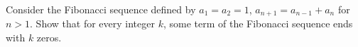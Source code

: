 Consider the Fibonacci sequence defined by $a_1 = a_2 = 1$, $a_{n+1} = a_{n-1} + a_n$ for $n > 1$. Show that for every integer $k$, some term of the Fibonacci sequence ends with $k$ zeros.
